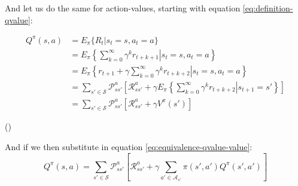 And let us do the same for action-values, starting with equation
\ref{eq:definition-qvalue}:

\begin{equation}
  \begin{split}
    Q^\pi(s, a) & = E_\pi \lbrace R_t | s_t = s, a_t = a \rbrace \\
    & = E_\pi \left\{ \left. \sum_{k=0}^\infty \gamma^kr_{t+k+1} \right| s_t = s, a_t = a \right\} \\
    & = E_\pi \left\{ \left. r_{t+1} + \gamma\sum_{k=0}^\infty \gamma^kr_{t+k+2} \right| s_t = s, a_t = a \right\} \\
    & = \sum_{s' \in \mathcal{S}}\mathcal{P}^a_{ss'} \left[\mathcal{R}^a_{ss'} +
      \gamma E_\pi \left\{ \left. \sum_{k=0}^\infty \gamma^kr_{t+k+2} \right| s_{t+1}
        = s' \right\} \right] \\
    & = \sum_{s' \in \mathcal{S}}\mathcal{P}^a_{ss'}
    \left[\mathcal{R}^a_{ss'} + \gamma V^\pi(s') \right]
  \end{split}
\end{equation}

(\cite[Section~3.7]{sutton1998introduction})

And if we then substitute in equation \ref{eq:equivalence-qvalue-value}:
\begin{equation}
  Q^\pi(s, a) = \sum_{s' \in \mathcal{S}}\mathcal{P}^a_{ss'}
    \left[\mathcal{R}^a_{ss'} + \gamma \sum_{a'\in\mathcal{A}_{s'}}\pi(s', a')Q^\pi(s', a') \right]
    \label{eq:bellman-q}
\end{equation}


